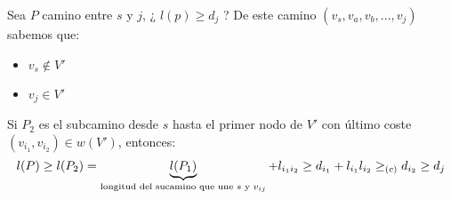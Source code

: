 \documentclass[openany]{book}
\begin{document}


\begin{demonstration}
    Sea $ P $ camino entre $ s $ y $ j  $, ¿ $ l(p)\geq d_j $ ? De este camino $ (v_{s},v_{a},v_{b},...,v_{j}) $ sabemos que:
    \begin{itemize}
        \item $ v_{s} \not \in V' $
        \item $ v_j \in V' $
    \end{itemize}
    Si $ P_{2} $ es el subcamino desde $ s $ hasta el primer nodo de $ V' $ con último coste $ (v_{i_1},v_{i_2}) \in w(V') $, entonces:
    $$ l(P) \geq l(P_2) =\underbrace{l(P_1)}_{\text{longitud del sucamino que une $ s $ y $ v_{ij} $}}+l_{i_1i_2} \geq d_{i_1} + l_{i_1}l_{i_2} \geq _{(c)} d_{i_2} \geq d_j$$
\end{demonstration}
\end{document}
